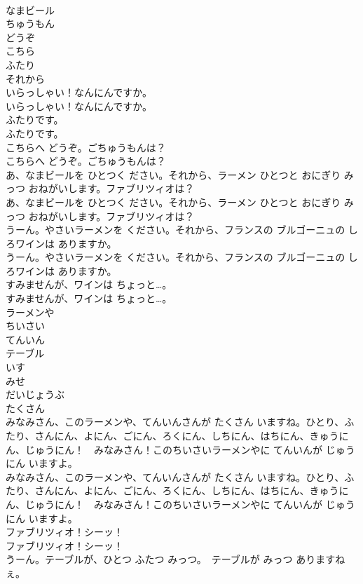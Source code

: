 \documentclass[8pt]{extreport}
\begin{document}
\begin{CJK}{UTF8}{min}
\\	なまビール
\\	ちゅうもん
\\	どうぞ
\\	こちら
\\	ふたり
\\	それから
\\	いらっしゃい！なんにんですか。	
\\	いらっしゃい！なんにんですか。 
\\	ふたりです。	
\\	ふたりです。 
\\	こちらへ どうぞ。ごちゅうもんは？	
\\	こちらへ どうぞ。ごちゅうもんは？ 
\\	あ、なまビールを ひとつく ださい。それから、ラーメン ひとつと おにぎり みっつ おねがいします。ファブリツィオは？	
\\	あ、なまビールを ひとつく ださい。それから、ラーメン ひとつと おにぎり みっつ おねがいします。ファブリツィオは？ 
\\	うーん。やさいラーメンを ください。それから、フランスの ブルゴーニュの しろワインは ありますか。	
\\	うーん。やさいラーメンを ください。それから、フランスの ブルゴーニュの しろワインは ありますか。 
\\	すみませんが、ワインは ちょっと…。	
\\	すみませんが、ワインは ちょっと…。 
\\	ラーメンや
\\	ちいさい
\\	てんいん
\\	テーブル
\\	いす
\\	みせ
\\	だいじょうぶ
\\	たくさん
\\	みなみさん、このラーメンや、てんいんさんが たくさん いますね。ひとり、ふたり、さんにん、よにん、ごにん、ろくにん、しちにん、はちにん、きゅうにん、じゅうにん！　みなみさん！このちいさいラーメンやに てんいんが じゅうにん いますよ。	
\\	みなみさん、このラーメンや、てんいんさんが たくさん いますね。ひとり、ふたり、さんにん、よにん、ごにん、ろくにん、しちにん、はちにん、きゅうにん、じゅうにん！　みなみさん！このちいさいラーメンやに てんいんが じゅうにん いますよ。 
\\	ファブリツィオ！シーッ！	
\\	ファブリツィオ！シーッ！ 
\\	うーん。テーブルが、ひとつ ふたつ みっつ。　テーブルが みっつ ありますねぇ。	

\end{CJK}
\end{document}
